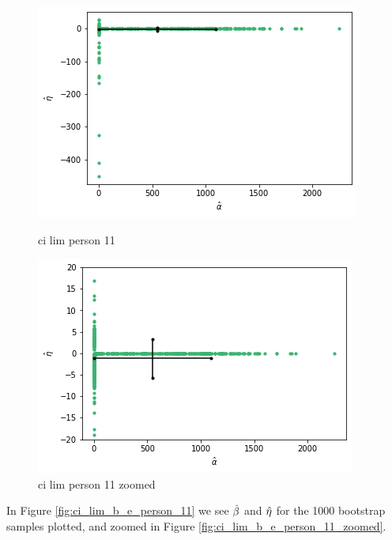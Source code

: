 \begin{figure}
    \centering
    \begin{minipage}{0.48\textwidth}
        \centering
        \includegraphics[scale=0.37]{pictures/ci_lim_a_e_person11.png}
        \caption{ci lim person 11}
        \label{fig:ci_lim_a_e_person_11}
    \end{minipage}\hfill
    \begin{minipage}{0.48\textwidth}
        \centering
        \includegraphics[scale=0.37]{pictures/ci_lim_a_e_person11_zoomed.png}
        \caption{ci lim person 11 zoomed}
        \label{fig:ci_lim_a_e_person_11_zoomed}
    \end{minipage}
\end{figure}
In Figure \ref{fig:ci_lim_b_e_person_11} we see $\hat{\beta}$ and $\hat{\eta}$ for the 1000 bootstrap samples plotted, and zoomed in Figure \ref{fig:ci_lim_b_e_person_11_zoomed}.
